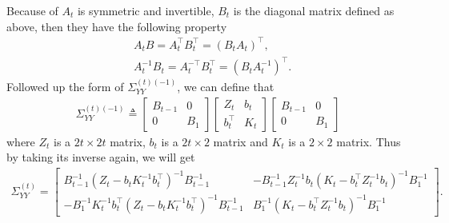 Because of $A_t$ is symmetric and invertible, $B_t$ is the diagonal matrix defined as above, then they have the following property 
\begin{align*}
& A_tB=A_t^\top B_t^\top = (B_tA_t)^\top, \\
& A_t^{-1}B_t = A_t^{-\top}B_t^\top = (B_tA_t^{-1})^\top. 
\end{align*}
Followed up the form of $\Sigma_{YY}^{(t) (-1)}$, we can define that 
\begin{align*}
\Sigma_{YY}^{(t) (-1)} \triangleq \begin{bmatrix} 
B_{t-1} & 0 \\ 0 & B_1 \end{bmatrix}
\begin{bmatrix} 
Z_{t} & b_{t} \\
b_{t}^\top & K_{t}
\end{bmatrix} \begin{bmatrix} 
B_{t-1} & 0 \\ 0 & B_1\end{bmatrix}
\end{align*}
where $Z_{t}$ is a $2t \times 2t$ matrix, $ b_{t} $ is a $2t \times 2$ matrix and $K_{t}$ is a $2 \times 2$ matrix. Thus by taking its inverse again, we will get 
\begin{align*} \Sigma_{YY}^{(t)}= \left[ \begin{matrix}
B_{t-1}^{-1} (Z_{t}-b_{t}K_{t}^{-1}b_{t}^\top)^{-1}B_{t-1}^{-1}  & - B_{t-1}^{-1}  Z_{t}^{-1}b_{t}(K_{t}-b_{t}^\top Z_{t}^{-1}b_{t})^{-1}B_1^{-1} \\
-B_1^{-1}  K_{t}^{-1}b_{t}^\top (Z_{t}-b_{t}K_{t}^{-1}b_{t}^\top)^{-1}B_{t-1}^{-1}  & B_1^{-1}  (K_{t}-b_{t}^\top Z_{t}^{-1}b_{t})^{-1}B_1^{-1} 
\end{matrix}\right].
\end{align*}

